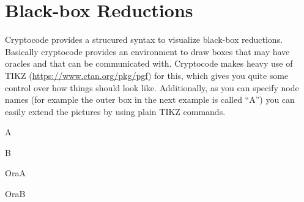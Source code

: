 \documentclass[a4paper]{report}
\begin{document}
\section{Black-box Reductions}
Cryptocode provides a strucured syntax to visualize black-box reductions. Basically cryptocode
provides an environment to draw boxes that may have oracles and that can be communicated with.
Cryptocode makes heavy use of TIKZ (\url{https://www.ctan.org/pkg/pgf}) for this, which gives you 
quite some control over how things should look like. Additionally, as you can specify node names
(for example the outer box in the next example is called \enquote{A}) you can easily extend the pictures
by using plain TIKZ commands.
\begin{bbrenv}{A}
	\begin{bbrbox}[name=Reduction]

	\begin{bbrenv}{B}
		\begin{bbrbox}[name=Adversary,minheight=4cm]
		\end{bbrbox}


	\end{bbrenv}


	\end{bbrbox}

	\begin{bbroracle}{OraA}
		\begin{bbrbox}[name=Oracle 1,minheight=1cm]
		\end{bbrbox}
	\end{bbroracle}

	\begin{bbroracle}{OraB}
		\begin{bbrbox}[name=Oracle 2,minheight=1cm]
		\end{bbrbox}
	\end{bbroracle}
\end{bbrenv}
\end{document}
